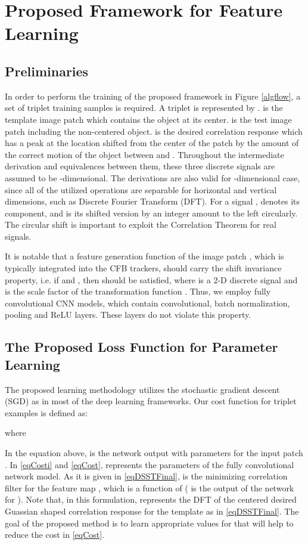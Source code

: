 \documentclass[journal]{IEEEtran}
\begin{document}
\section{Proposed Framework for Feature Learning}
\label{secProposed}
\subsection{Preliminaries}
In order to perform the training of the proposed framework in Figure \ref{algflow}, a set of triplet training samples is required. A triplet is represented by .  is the template image patch which contains the object at its center.  is the test image patch including the non-centered object.  is the desired correlation response which has a peak at the location shifted from the center of the patch by the amount of the correct motion of the object between  and . Throughout the intermediate derivation and equivalences between them, these three discrete signals are assumed to be -dimensional. The derivations are also valid for -dimensional case, since all of the utilized operations are separable for horizontal and vertical dimensions, such as Discrete Fourier Transform (DFT). For a signal ,  denotes its  component, and  is its shifted version by an integer amount  to the left circularly. The circular shift is important to exploit the Correlation Theorem for real signals.

It is notable that a feature generation function  of the image patch , which is typically integrated into the CFB trackers, should carry the shift invariance property, i.e. if  and , then  should be satisfied, where  is a 2-D discrete signal and  is the scale factor of the transformation function . Thus, we employ fully convolutional CNN models, which contain convolutional, batch normalization, pooling and ReLU layers. These layers do not violate this property.
\subsection{The Proposed Loss Function for Parameter Learning}
The proposed learning methodology utilizes the stochastic gradient descent (SGD) as in most of the deep learning frameworks. Our cost function for  triplet examples is defined as:

where

In the equation above,  is the network output with parameters  for the input patch . In \eqref{eqCosti} and \eqref{eqCost},  represents the parameters of the fully convolutional network model. As it is given in \eqref{eqDSSTFinal},  is the minimizing correlation filter for the feature map , which is a function of  ( is the output of the network for ). Note that, in this formulation,  represents the DFT of the centered desired Guassian shaped correlation response for the template  as in \eqref{eqDSSTFinal}. The goal of the proposed method is to learn appropriate values for  that will help to reduce the cost in \eqref{eqCost}.
\end{document}
